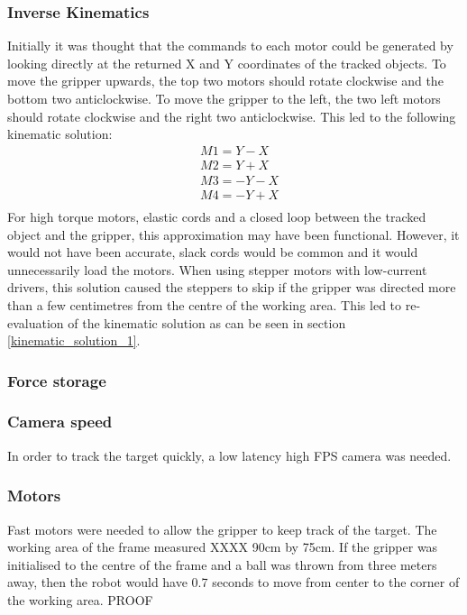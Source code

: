 \documentclass[conference]{IEEEtran}
\begin{document}
\subsubsection{Inverse Kinematics}\label{initial_kinematics}
Initially it was thought that the commands to each motor could be generated by looking directly at the returned X and Y coordinates of the tracked objects. To move the gripper upwards, the top two motors should rotate clockwise and the bottom two anticlockwise. To move the gripper to the left, the two left motors should rotate clockwise and the right two anticlockwise. This led to the following kinematic solution:
\begin{equation}
\begin{aligned}
&M1 = Y - X \\
&M2 = Y + X\\
&M3 = -Y -X\\
&M4 = -Y + X\\
\end{aligned}
\end{equation}
For high torque motors, elastic cords and a closed loop between the tracked object and the gripper, this approximation may have been functional. However, it would not have been accurate, slack cords would be common and it would unnecessarily load the motors. When using stepper motors with low-current drivers, this solution caused the steppers to skip if the gripper was directed more than a few centimetres from the centre of the working area. 
This led to re-evaluation of the kinematic solution as can be seen in section \ref{kinematic_solution_1}.

\subsubsection{Force storage} \label{force_problem}


\subsubsection{Camera speed}
In order to track the target quickly, a low latency high FPS camera was needed.
\subsubsection{Motors}
Fast motors were needed to allow the gripper to keep track of the target. The working area of the frame measured XXXX 90cm by 75cm. If the gripper was initialised to the centre of the frame and a ball was thrown from three meters away, then the robot would have 0.7 seconds to move from center to the corner of the working area. PROOF
\end{document}
